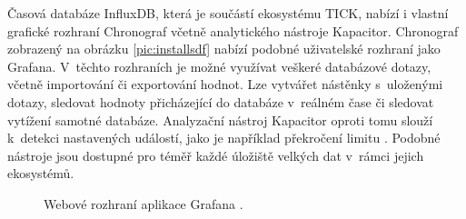 Časová databáze InfluxDB, která je součástí ekosystému TICK, nabízí i vlastní grafické rozhraní Chronograf včetně analytického nástroje Kapacitor. Chronograf zobrazený na obrázku \ref{pic:installsdf} nabízí podobné uživatelské rozhraní jako Grafana. V~těchto rozhraních je možné využívat veškeré databázové dotazy, včetně importování či exportování hodnot. Lze vytvářet nástěnky s~uloženými dotazy, sledovat hodnoty přicházející do databáze v~reálném čase či sledovat vytížení samotné databáze. Analyzační nástroj Kapacitor oproti tomu slouží k~detekci nastavených událostí, jako je například překročení limitu \cite{Influx}. Podobné nástroje jsou dostupné pro téměř každé úložiště velkých dat v~rámci jejich ekosystémů.



\begin{figure}[h]
  \centering
  \caption{Webové rozhraní aplikace Grafana \cite{grafana}.}\label{pic:grafana}
\end{figure}


